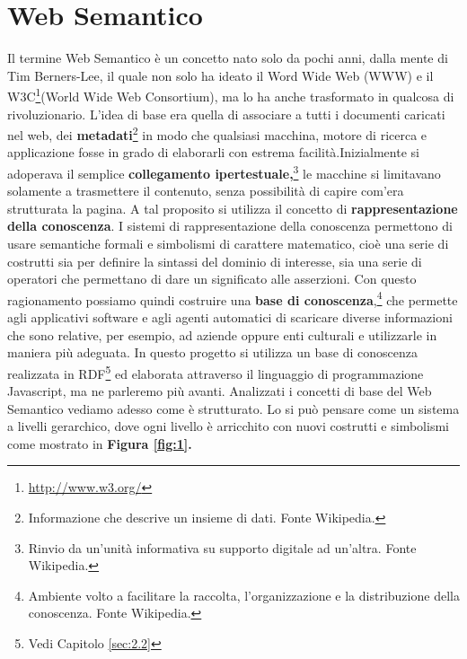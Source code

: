 \documentclass[a4paper,11pt]{article}
\begin{document}
\section{Web Semantico}
\label{sec:2}
Il termine Web Semantico\cite{BerHenLas2001, Lee1998, ShaNigBerHal2006} è un
concetto nato solo da pochi anni, dalla mente di Tim Berners-Lee, il quale non solo ha ideato il Word Wide Web (WWW) e il W3C\footnote{\url{http://www.w3.org/}}(World Wide Web Consortium), ma lo ha anche trasformato in qualcosa di rivoluzionario. L'idea di base era quella di associare a tutti i documenti caricati nel web, dei \textbf{metadati}\footnote{Informazione che descrive un insieme di dati. Fonte Wikipedia.} in modo che qualsiasi macchina, motore di ricerca e applicazione fosse in grado di elaborarli con estrema facilità.\newline Inizialmente si adoperava il semplice \textbf{collegamento ipertestuale,}\footnote{Rinvio da un'unità informativa su supporto digitale ad un'altra. Fonte Wikipedia.} le macchine si limitavano solamente a trasmettere il contenuto, senza possibilità di capire com'era strutturata la pagina.
A tal proposito si utilizza il concetto di \textbf{rappresentazione della conoscenza}.
I sistemi di rappresentazione della conoscenza permettono di usare semantiche formali e simbolismi di carattere matematico, cioè una serie di costrutti sia per definire la sintassi del dominio di interesse, sia una serie di operatori che permettano di dare un significato alle asserzioni.
Con questo ragionamento possiamo quindi costruire una \textbf{base di conoscenza},\footnote{Ambiente volto a facilitare la raccolta, l'organizzazione e la distribuzione della conoscenza. Fonte Wikipedia.} che permette agli applicativi software e agli agenti automatici di scaricare diverse informazioni che sono relative, per esempio, ad aziende oppure enti culturali e utilizzarle in maniera più adeguata. In questo progetto si utilizza un base di conoscenza realizzata in RDF\footnote{Vedi Capitolo \ref{sec:2.2}} ed elaborata attraverso il linguaggio di programmazione Javascript, ma ne parleremo più avanti.\newline
Analizzati i concetti di base del Web Semantico vediamo adesso come è strutturato. Lo si può pensare come un sistema a livelli gerarchico, dove ogni livello è arricchito con nuovi costrutti e simbolismi come mostrato in \textbf{Figura \ref{fig:1}.}
\end{document}
